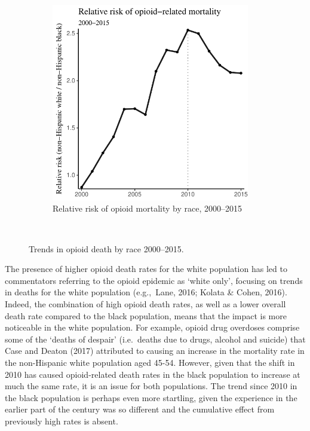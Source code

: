 \documentclass[12pt, a4paper]{article}
\begin{document}
\begin{figure}[h!]
\begin{subfigure} [b]{0.5\textwidth}
\includegraphics[width=0.95\textwidth]{./plots/paper_fig2_relative_risk_v.pdf} 
 \caption{Relative risk of opioid mortality by race, 2000--2015}
 \label{fig:overall_rr}
 \end{subfigure} ~
  \caption{Trends in opioid death by race 2000--2015.}
\end{figure}

The presence of higher opioid death rates for the white population has led to commentators referring to the opioid epidemic as `white only', focusing on trends in deaths for the white population (e.g.,\ Lane, 2016; Kolata \& Cohen, 2016). Indeed, the combination of high opioid death rates, as well as a lower overall death rate compared to the black population, means that the impact is more noticeable in the white population. For example, opioid drug overdoses comprise some of the `deaths of despair' (i.e.\ deaths due to drugs, alcohol and suicide) that Case and Deaton (2017) attributed to causing an increase in the mortality rate in the non-Hispanic white population aged 45-54. However, given that the shift in 2010 has caused opioid-related death rates in the black population to increase at much the same rate, it is an issue for both populations. The trend since 2010 in the black population is perhaps even more startling, given the experience in the earlier part of the century was so different and the cumulative effect from previously high rates is absent.
\end{document}
